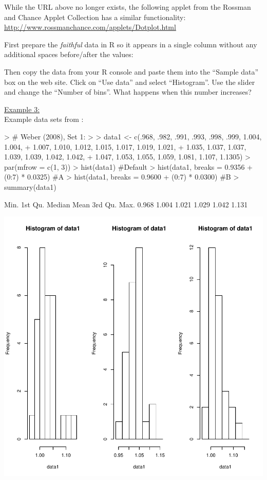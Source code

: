 While the URL above no longer exists, the following applet 
from the Rossman and Chance Applet Collection has a similar functionality:
\url{http://www.rossmanchance.com/applets/Dotplot.html}

First prepare the {\it faithful} data in R so it appears in a single column
without any additional spaces before/after the values:

\begin{Schunk}
\end{Schunk}

Then copy the data from your R console and paste them into the ``Sample data''
box on the web site. Click on ``Use data'' and select ``Histogram''.
Use the slider and change the ``Number of bins''. What happens when this number increases?


\newpage


\noindent
\underline{Example 3:} \\

Example data sets from \citet{Web2008}:
\begin{Schunk}
\begin{Sinput}
> # Weber (2008), Set 1:
> 
> data1 <- c(.968, .982, .991, .993, .998, .999, 1.004, 1.004,
+   1.007, 1.010, 1.012, 1.015, 1.017, 1.019, 1.021,
+   1.035, 1.037, 1.037, 1.039, 1.039, 1.042, 1.042,
+   1.047, 1.053, 1.055, 1.059, 1.081, 1.107, 1.1305)
> par(mfrow = c(1, 3))
> hist(data1) #Default
> hist(data1, breaks = 0.9356 + (0:7) * 0.0325) #A
> hist(data1, breaks = 0.9600 + (0:7) * 0.0300) #B
> summary(data1)
\end{Sinput}
\begin{Soutput}
   Min. 1st Qu.  Median    Mean 3rd Qu.    Max. 
  0.968   1.004   1.021   1.029   1.042   1.131 
\end{Soutput}
\end{Schunk}
\includegraphics{lect_chapter5_v2-002}

